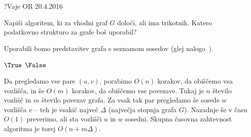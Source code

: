 \begin{naloga}{?}{Vaje OR 20.4.2016}
\begin{vprasanje}
Napiši algoritem, ki za vhodni graf $G$ določi, ali ima trikotnik.
Katero podatkovno strukturo za grafe boš uporabil?
\end{vprasanje}

\begin{odgovor}
Uporabili bomo predstavitev grafa s seznamom sosedov
(glej nalogo~\res[sosgraf]).
\begin{small}
\begin{algorithmic}
                    \State \Return $\True$
                \EndIf
            \EndFor
        \EndFor
    \EndFor
    \Return $\False$
\EndFunction
\end{algorithmic}
\end{small}
Da pregledamo vse pare $(u, v)$, porabimo $O(n)$ korakov,
da obiščemo vsa vozlišča,
in še $O(m)$ korakov, da obiščemo vse povezave.
Tukaj je $n$ število vozlišč in $m$ število povezav grafa.
Za vsak tak par pregledamo še sosede $w$ vozlišča $v$
-- teh je vsakič največ $\Delta$ (največja stopnja grafa $G$).
Nazadnje še v času $O(1)$ preverimo, ali sta vozlišči $u$ in $w$ sosedni.
Skupna časovna zahtevnost algoritma je torej $O(n + m\Delta)$.
\end{odgovor}
\end{naloga}
